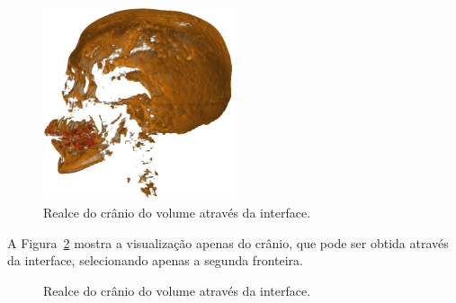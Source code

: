 \begin{figure}[h]
	\centering
	\includegraphics[width=0.5\textwidth]{images/r_m_cthead_iso2}
	\caption{Realce do crânio do volume  através da interface.}
	\label{fig:r_cthead_iso2}
\end{figure}
	
	A Figura~\ref{fig:r_cthead_iso} mostra a visualização apenas do crânio, que pode ser obtida através da interface, selecionando apenas a segunda fronteira.

\begin{figure}[h]
	\centering
	\caption{Realce do crânio do volume  através da interface.}
	\label{fig:r_cthead_iso}
\end{figure}

